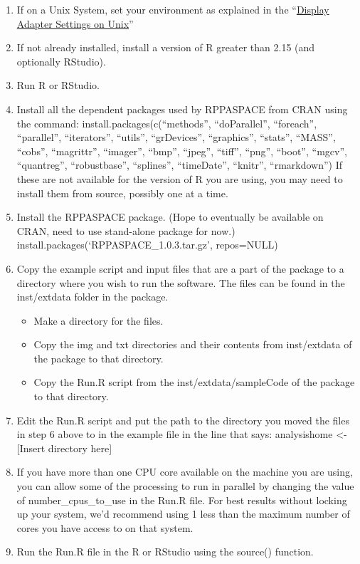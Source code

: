 \documentclass[
]{article}
\providecommand{\tightlist}{%
  \setlength{\itemsep}{0pt}\setlength{\parskip}{0pt}}
\begin{document}
\begin{enumerate}
\def\labelenumi{\arabic{enumi}.}
\tightlist
\item
  If on a Unix System, set your environment as explained in the
  ``\protect\hyperlink{unix}{Display Adapter Settings on Unix}''\\
\item
  If not already installed, install a version of R greater than 2.15
  (and optionally RStudio).\\
\item
  Run R or RStudio.\\
\item
  Install all the dependent packages used by RPPASPACE from CRAN using
  the command: install.packages(c(``methods'', ``doParallel'',
  ``foreach'', ``parallel'', ``iterators'', ``utils'', ``grDevices'',
  ``graphics'', ``stats'', ``MASS'', ``cobs'', ``magrittr'', ``imager'',
  ``bmp'', ``jpeg'', ``tiff'', ``png'', ``boot'', ``mgcv'',
  ``quantreg'', ``robustbase'', ``splines'', ``timeDate'', ``knitr'',
  ``rmarkdown'') If these are not available for the version of R you are
  using, you may need to install them from source, possibly one at a
  time.\\
\item
  Install the RPPASPACE package. (Hope to eventually be available on
  CRAN, need to use stand-alone package for now.)
  install.packages(`RPPASPACE\_1.0.3.tar.gz', repos=NULL)\\
\item
  Copy the example script and input files that are a part of the package
  to a directory where you wish to run the software. The files can be
  found in the inst/extdata folder in the package.

  \begin{itemize}
  \tightlist
  \item
    Make a directory for the files.\\
  \item
    Copy the img and txt directories and their contents from
    inst/extdata of the package to that directory.\\
  \item
    Copy the Run.R script from the inst/extdata/sampleCode of the
    package to that directory.\\
  \end{itemize}
\item
  Edit the Run.R script and put the path to the directory you moved the
  files in step 6 above to in the example file in the line that says:
  analysishome \textless- {[}Insert directory here{]}\\
\item
  If you have more than one CPU core available on the machine you are
  using, you can allow some of the processing to run in parallel by
  changing the value of number\_cpus\_to\_use in the Run.R file. For
  best results without locking up your system, we'd recommend using 1
  less than the maximum number of cores you have access to on that
  system.\\
\item
  Run the Run.R file in the R or RStudio using the source() function.
\end{enumerate}
\end{document}
